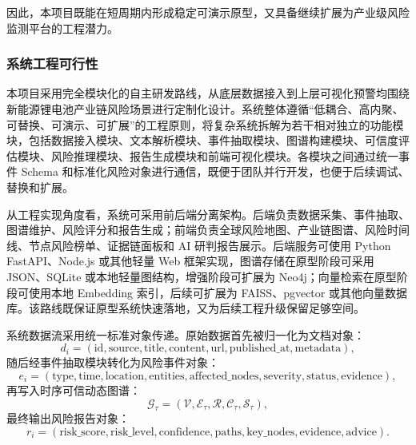 ﻿\documentclass[12pt,a4paper]{article}
\begin{document}
因此，本项目既能在短周期内形成稳定可演示原型，又具备继续扩展为产业级风险监测平台的工程潜力。

\subsubsection{系统工程可行性}

本项目采用完全模块化的自主研发路线，从底层数据接入到上层可视化预警均围绕新能源锂电池产业链风险场景进行定制化设计。系统整体遵循“低耦合、高内聚、可替换、可演示、可扩展”的工程原则，将复杂系统拆解为若干相对独立的功能模块，包括数据接入模块、文本解析模块、事件抽取模块、图谱构建模块、可信度评估模块、风险推理模块、报告生成模块和前端可视化模块。各模块之间通过统一事件 Schema 和标准化风险对象进行通信，既便于团队并行开发，也便于后续调试、替换和扩展。

从工程实现角度看，系统可采用前后端分离架构。后端负责数据采集、事件抽取、图谱维护、风险评分和报告生成；前端负责全球风险地图、产业链图谱、风险时间线、节点风险榜单、证据链面板和 AI 研判报告展示。后端服务可使用 Python FastAPI、Node.js 或其他轻量 Web 框架实现，图谱存储在原型阶段可采用 JSON、SQLite 或本地轻量图结构，增强阶段可扩展为 Neo4j；向量检索在原型阶段可使用本地 Embedding 索引，后续可扩展为 FAISS、pgvector 或其他向量数据库。该路线既保证原型系统快速落地，又为后续工程升级保留足够空间。

系统数据流采用统一标准对象传递。原始数据首先被归一化为文档对象：
\begin{equation}
d_i=(\text{id},\text{source},\text{title},\text{content},\text{url},\text{published\_at},\text{metadata}),
\end{equation}
随后经事件抽取模块转化为风险事件对象：
\begin{equation}
e_i=(\text{type},\text{time},\text{location},\text{entities},\text{affected\_nodes},\text{severity},\text{status},\text{evidence}),
\end{equation}
再写入时序可信动态图谱：
\begin{equation}
\mathcal{G}_{\tau}=(\mathcal{V},\mathcal{E}_{\tau},\mathcal{R},\mathcal{C}_{\tau},\mathcal{S}_{\tau}),
\end{equation}
最终输出风险报告对象：
\begin{equation}
r_i=(\text{risk\_score},\text{risk\_level},\text{confidence},\text{paths},\text{key\_nodes},\text{evidence},\text{advice}).
\end{equation}
\end{document}
